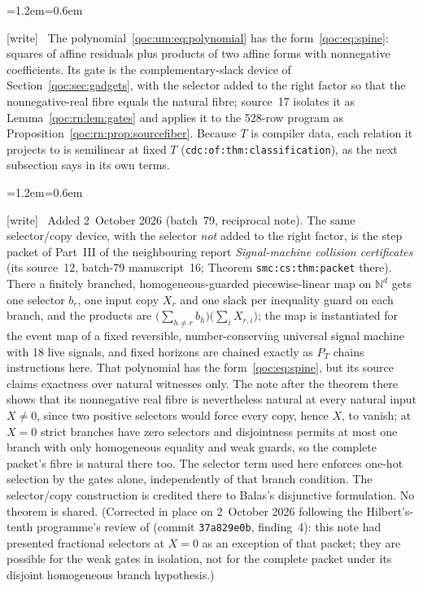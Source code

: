 \documentclass[11pt,letterpaper]{article}
\theoremstyle{definition}
\theoremstyle{remark}
\newcommand{\N}{\mathbb N}
\newcommand{\wtag}{\textup{[write]}}
\newenvironment{writenote}{\par\smallskip\begin{list}{}{\leftmargin=1.2em\rightmargin=0.6em}\item[]\small\wtag\ }{\end{list}\smallskip}
\newcommand{\lab}[1]{\nolinkurl{#1}}
\begin{document}
\begin{writenote}
The polynomial~\eqref{qoc:um:eq:polynomial} has the form~\eqref{qoc:eq:spine}: squares of affine residuals plus products of two affine forms with nonnegative coefficients. Its gate is the complementary-slack device of Section~\ref{qoc:sec:gadgets}, with the selector added to the right factor so that the nonnegative-real fibre equals the natural fibre; source~17 isolates it as Lemma~\ref{qoc:rn:lem:gates} and applies it to the 528-row program as Proposition~\ref{qoc:rn:prop:sourcefiber}. Because $T$ is compiler data, each relation it projects to is semilinear at fixed $T$ (\lab{cdc:of:thm:classification}), as the next subsection says in its own terms.
\end{writenote}

\begin{writenote}
Added 2~October 2026 (batch~79, reciprocal note). The same selector/copy device, with the selector \emph{not} added to the right factor, is the step packet of Part~III of the neighbouring report \emph{Signal-machine collision certificates} (its source~12, batch-79 manuscript~16; Theorem \lab{smc:cs:thm:packet} there). There a finitely branched, homogeneous-guarded piecewise-linear map on $\N^d$ gets one selector $b_r$, one input copy $X_r$ and one slack per inequality guard on each branch, and the products are $\bigl(\sum_{h\ne r}b_h\bigr)\bigl(\sum_iX_{r,i}\bigr)$; the map is instantiated for the event map of a fixed reversible, number-conserving universal signal machine with 18 live signals, and fixed horizons are chained exactly as $P_T$ chains instructions here. That polynomial has the form~\eqref{qoc:eq:spine}, but its source claims exactness over natural witnesses only. The note after the theorem there shows that its nonnegative real fibre is nevertheless natural at every natural input $X\ne0$, since two positive selectors would force every copy, hence $X$, to vanish; at $X=0$ strict branches have zero selectors and disjointness permits at most one branch with only homogeneous equality and weak guards, so the complete packet's fibre is natural there too. The selector term used here enforces one-hot selection by the gates alone, independently of that branch condition. The selector/copy construction is credited there to Balas's disjunctive formulation. No theorem is shared. (Corrected in place on 2~October 2026 following the Hilbert's-tenth programme's review  of  (commit \texttt{37a829e0b}, finding~4): this note had presented fractional selectors at $X=0$ as an exception of that packet; they are possible for the weak gates in isolation, not for the complete packet under its disjoint homogeneous branch hypothesis.)
\end{writenote}
\end{document}
